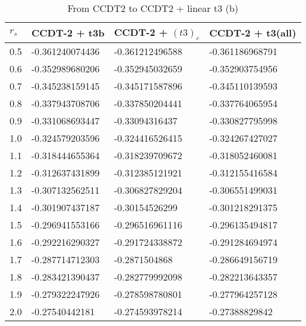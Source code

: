 \begin{table}[hbtp]
\caption{From CCDT2 to CCDT2 + linear t3 (b)}
\begin{center}
\begin{threeparttable}
\begin{tabular}{l l l l}
    \toprule
$r_s$ & CCDT-2 + t3b & CCDT-2 + $(t3)_c$ & CCDT-2 + t3(all)  \\ \hline
0.5 & -0.361240074436 & -0.361212496588 & -0.361186968791   \\
0.6 & -0.352989680206 & -0.352945032659 & -0.352903754956   \\
0.7 & -0.345238159145 & -0.345171587896 & -0.345110139593   \\
0.8 & -0.337943708706 & -0.337850204441 & -0.337764065954   \\
0.9 & -0.331068693447 & -0.33094316437 & -0.330827795998   \\
1.0 & -0.324579203596 & -0.324416526415 & -0.324267427027   \\
1.1 & -0.318444655364 & -0.318239709672 & -0.318052460081   \\
1.2 & -0.312637431899 & -0.312385121921 & -0.312155416584   \\
1.3 & -0.307132562511 & -0.306827829204 & -0.306551499031   \\
1.4 & -0.301907437187 & -0.30154526299 & -0.301218291375   \\
1.5 & -0.296941553166 & -0.296516961116 & -0.296135494817   \\
1.6 & -0.292216290327 & -0.291724338872 & -0.291284694974   \\
1.7 & -0.287714712303 & -0.2871504868 & -0.286649156719   \\
1.8 & -0.283421390437 & -0.282779992098 & -0.282213643357   \\
1.9 & -0.279322247926 & -0.278598780801 & -0.277964257128   \\
2.0 & -0.27540442181 & -0.274593978214 & -0.27388829842   \\
\bottomrule
\end{tabular}
\begin{tablenotes}
\end{tablenotes}
\end{threeparttable}
\end{center}
\label{tab:ccd2_to_ccdt3_2}
\end{table}


